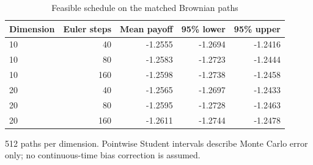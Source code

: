 \begin{table}[htbp]
\centering\small\setlength{\tabcolsep}{4pt}
\caption{Feasible schedule on the matched Brownian paths}\label{tab:r9schedule}
\begin{tabular}{lrrrr}
\toprule
Dimension & Euler steps & Mean payoff & 95\% lower & 95\% upper \\
\midrule
10 & 40 & -1.2555 & -1.2694 & -1.2416 \\
10 & 80 & -1.2583 & -1.2723 & -1.2444 \\
10 & 160 & -1.2598 & -1.2738 & -1.2458 \\
20 & 40 & -1.2565 & -1.2697 & -1.2433 \\
20 & 80 & -1.2595 & -1.2728 & -1.2463 \\
20 & 160 & -1.2611 & -1.2744 & -1.2478 \\
\bottomrule
\end{tabular}
\par\vspace{3pt}\begin{minipage}{0.97\linewidth}\footnotesize 512 paths per dimension. Pointwise Student intervals describe Monte Carlo error only; no continuous-time bias correction is assumed.\end{minipage}
\end{table}
